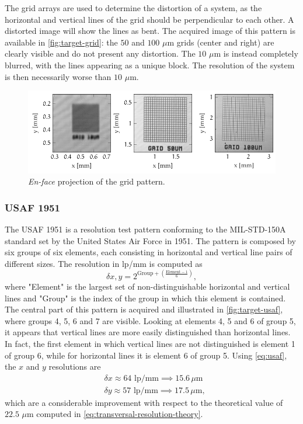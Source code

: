 The grid arrays are used to determine the distortion of a system, as the horizontal and vertical lines of the grid should be perpendicular to each other. A distorted image will show the lines as bent. The acquired image of this pattern is available in \autoref{fig:target-grid}: the $50$ and $100$ $\mu$m grids (center and right) are clearly visible and do not present any distortion. The $10$ $\mu$m is instead completely blurred, with the lines appearing as a unique block. The resolution of the system is then necessarily worse than $10$ $\mu$m. 

\begin{figure}[hbt]
	\centering
	\includegraphics[width=\linewidth]{gfx/ch4/axsun/target/grid}
	\caption{\emph{En-face} projection of the grid pattern.}\label{fig:target-grid}
\end{figure}


\subsubsection{USAF 1951}
The USAF 1951 is a resolution test pattern conforming to the MIL-STD-150A standard set by the United States Air Force in 1951. The pattern is composed by six groups of six elements, each consisting in horizontal and vertical line pairs of different sizes. The resolution in lp/mm is computed as
\begin{equation}\label{eq:usaf}
	\delta x,y = 2^{\text{Group} + \left(\frac{\text{Element} - 1}{6}\right)},
\end{equation}
where "Element" is the largest set of non-distinguishable horizontal and vertical lines and "Group" is the index of the group in which this element is contained. The central part of this pattern is acquired and illustrated in \autoref{fig:target-usaf}, where groups 4, 5, 6 and 7 are visible. Looking at elements 4, 5 and 6 of group 5, it appears that vertical lines are more easily distinguished than horizontal lines. In fact, the first element in which vertical lines are not distinguished is element 1 of group 6, while for horizontal lines it is element 6 of group 5. Using \autoref{eq:usaf}, the $x$ and $y$ resolutions are
\begin{align}
	&\delta x \approx 64 \text{ lp/mm} \implies 15.6\,\mu\text{m} \\
	&\delta y \approx 57 \text{ lp/mm} \implies 17.5\,\mu\text{m},
\end{align}
which are a considerable improvement with respect to the theoretical value of $22.5$ $\mu$m computed in \autoref{eq:transversal-resolution-theory}. 

